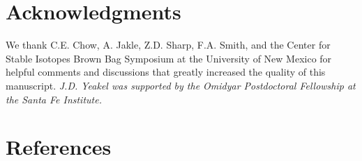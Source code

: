 \documentclass{article}
\begin{document}
\section*{Acknowledgments}
We thank C.E. Chow, A. Jakle, Z.D. Sharp, F.A. Smith, and the Center for Stable Isotopes Brown Bag Symposium at the University of New Mexico for helpful comments and discussions that greatly increased the quality of this manuscript.
\emph{J.D. Yeakel was supported by the Omidyar Postdoctoral Fellowship at the Santa Fe Institute.}


\newpage
\section*{References}


\end{document}

